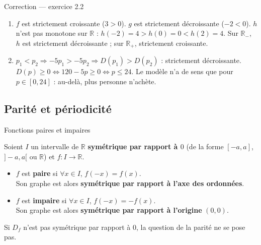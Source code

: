 \documentclass[aspectratio=169,11pt]{beamer}
\newcommand{\R}{\mathbb{R}}
\newcommand{\key}[1]{\textbf{\color{DarkBlue}#1}}
\newcommand{\important}[1]{\textbf{\color{DarkRed}#1}}
\newcommand{\fonc}[3]{#1\colon #2\to #3}
\begin{document}
\begin{frame}{Correction --- exercice 2.2}
	\begin{definitionbox}[Correction]
		\begin{enumerate}
			\item $f$ est strictement croissante ($3>0$). $g$ est strictement décroissante ($-2<0$).
			$h$ n'est pas monotone sur $\R$ : $h(-2)=4>h(0)=0<h(2)=4$.
			Sur $\R_-$, $h$ est strictement décroissante ; sur $\R_+$, strictement croissante.
			\item $p_1<p_2\Rightarrow -5p_1>-5p_2\Rightarrow D(p_1)>D(p_2)$ : strictement décroissante.
			$D(p)\ge 0\iff 120-5p\ge 0\iff p\le 24$.
			Le modèle n'a de sens que pour $p\in[0,24]$ : au-delà, plus personne n'achète.
		\end{enumerate}
	\end{definitionbox}
\end{frame}

\subsection{Parité et périodicité}

\begin{frame}{Fonctions paires et impaires}
	\begin{definitionbox}
		Soient $I$ un intervalle de $\R$ \key{symétrique par rapport à $0$}
		(de la forme $[-a,a]$, $]-a,a[$ ou $\R$) et $\fonc{f}{I}{\R}$.
		\begin{itemize}
			\item $f$ est \key{paire} si $\forall x\in I$, $f(-x)=f(x)$.\\
			Son graphe est alors \important{symétrique par rapport à l'axe des ordonnées}.
			\item $f$ est \key{impaire} si $\forall x\in I$, $f(-x)=-f(x)$.\\
			Son graphe est alors \important{symétrique par rapport à l'origine} $(0,0)$.
		\end{itemize}
	\end{definitionbox}
	\vspace{0.15cm}
	\begin{attentionbox}
		Si $D_f$ n'est pas symétrique par rapport à $0$, la question de la parité
		ne se pose pas.
	\end{attentionbox}
\end{frame}
\end{document}
